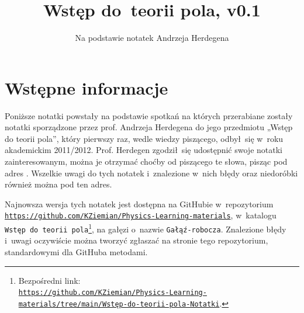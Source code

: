 \documentclass[a4paper,11pt]{article}
\title{Wstęp do~teorii pola, v0.1}
\author{Na podstawie notatek Andrzeja Herdegena}
\numberwithin{equation}{section}
\begin{document}





\maketitle






\section{Wstępne informacje}


Poniższe notatki powstały na podstawie spotkań na których przerabiane
zostały notatki sporządzone przez prof. Andrzeja Herdegena do jego przedmiotu
„Wstęp do teorii pola”, który pierwszy raz, wedle wiedzy piszącego,
odbył~się w~roku akademickim 2011/2012. Prof. Herdegen zgodził~się
udostępnić swoje notatki zainteresowanym, można je otrzymać choćby od
piszącego te słowa, pisząc pod adres \email. Wszelkie uwagi do tych notatek
i~znalezione w~nich błędy oraz niedoróbki również można pod ten
adres.

Najnowsza wersja tych notatek jest dostępna na GitHubie w~repozytorium
\href{https://github.com/KZiemian/Physics-Learning-materials}
{\texttt{https://github.com/KZiemian/Physics-Learning-materials}}, w~katalogu
\texttt{Wstęp do teorii pola}\footnote{Bezpośredni link: \\
  \href{https://github.com/KZiemian/Physics-Learning-materials/tree/main/Wstęp-do-teorii-pola-Notatki}
{\texttt{https://github.com/KZiemian/Physics-Learning-materials/tree/main/Wstęp-do-teorii-pola-Notatki}}.}, na gałęzi o~nazwie \texttt{Gałąź-robocza}.
Znalezione błędy i~uwagi oczywiście można tworzyć zgłaszać na stronie tego
repozytorium, standardowymi dla GitHuba metodami.
\end{document}

